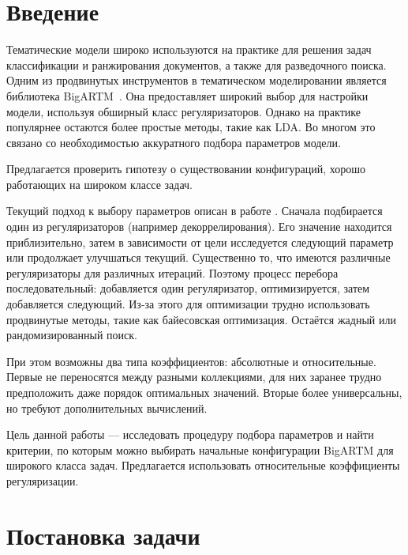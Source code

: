 \documentclass[12pt,twoside]{article}
\title
{Автоматическая настройка параметров BigARTM под широкий класс задач.}
\author
{Гришанов~А.\,В., Булатов~B.\,Г., Воронцов~К.\,В.} %
[Гришанов~А.\,В.$^1$, Булатов~B.\,Г.$^1$, Воронцов~К.\,В.$^1$] %
\begin{document}
	
	\maketitle
	
	\section{Введение}
	
	Тематические модели широко используются на практике для решения задач классификации и ранжирования документов, а также для разведочного поиска\cite{Ianina2016}. Одним из продвинутых инструментов в тематическом моделировании является библиотека BigARTM~\cite{vorontsov2015bigartm}. Она предоставляет широкий выбор для настройки модели, используя обширный класс регуляризаторов. Однако на практике популярнее остаются более простые методы, такие как LDA\cite{blei2003latent}. Во многом это связано со необходимостью аккуратного подбора параметров модели.
	
	Предлагается проверить гипотезу о существовании конфигураций, хорошо работающих на широком классе задач.
	
	Текущий подход к выбору параметров описан в работе \cite{Ianina2016}. Сначала подбирается один из регуляризаторов (например декоррелирования).  Его значение находится приблизительно, затем в зависимости от цели исследуется следующий параметр или продолжает улучшаться текущий. Существенно то, что имеются различные регуляризаторы  для различных итераций. Поэтому процесс перебора последовательный: добавляется один регуляризатор, оптимизируется, затем добавляется следующий. Из-за этого для оптимизации трудно использовать продвинутые методы, такие как байесовская оптимизация. Остаётся жадный или рандомизированный поиск.
	
	При этом возможны два типа коэффициентов: абсолютные и относительные. Первые не переносятся между разными коллекциями, для них заранее трудно предположить даже порядок оптимальных значений. Вторые более универсальны, но требуют дополнительных вычислений.
	
	Цель данной работы --- исследовать процедуру подбора параметров и найти критерии, по которым можно выбирать начальные конфигурации BigARTM для широкого класса задач. Предлагается использовать относительные коэффициенты регуляризации.
	
	\section{Постановка задачи}
	
\end{document}
